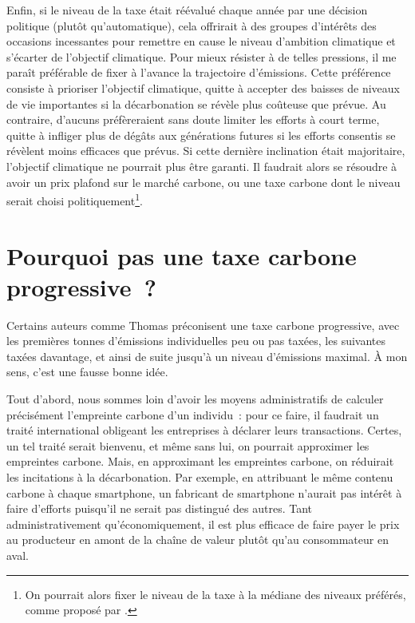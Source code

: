 \documentclass[a5paper,french,openany]{memoir}
\begin{document}
Enfin, si le niveau de la taxe était réévalué chaque année par une décision politique (plutôt qu'automatique), cela offrirait à des groupes d'intérêts des occasions incessantes pour remettre en cause le niveau d'ambition climatique et s'écarter de l'objectif climatique. Pour mieux résister à de telles pressions, il me paraît préférable de fixer à l'avance la trajectoire d'émissions. Cette préférence consiste à prioriser l'objectif climatique, quitte à accepter des baisses de niveaux de vie importantes si la décarbonation se révèle plus coûteuse que prévue. 
Au contraire, d'aucuns préfèreraient sans doute limiter les efforts à court terme, quitte à infliger plus de dégâts aux générations futures si les efforts consentis se révèlent moins efficaces que prévus. Si cette dernière inclination était majoritaire, l'objectif climatique ne pourrait plus être garanti. Il faudrait alors se résoudre à avoir un prix plafond sur le marché carbone, ou une taxe carbone dont le niveau serait choisi politiquement\footnote{On pourrait alors fixer le niveau de la taxe à la médiane des niveaux préférés, comme proposé par \cite{weitzman_world_2017}.}. 

\section*{\normalsize Pourquoi pas une taxe carbone progressive~?}\label{q:taxe_progressive}

Certains auteurs comme Thomas \cite{piketty_capital_2019} préconisent une taxe carbone progressive, avec les premières tonnes d'émissions individuelles peu ou pas taxées, les suivantes taxées davantage, et ainsi de suite jusqu'à un niveau d'émissions maximal. À mon sens, c'est une fausse bonne idée. 

Tout d'abord, nous sommes loin d'avoir les moyens administratifs de calculer précisément l'empreinte carbone d'un individu~: pour ce faire, il faudrait un traité international obligeant les entreprises à déclarer leurs transactions. Certes, un tel traité serait bienvenu, et même sans lui, on pourrait approximer les empreintes carbone. Mais, en approximant les empreintes carbone, on réduirait les incitations à la décarbonation. Par exemple, en attribuant le même contenu carbone à chaque smartphone, un fabricant de smartphone n'aurait pas intérêt à faire d'efforts puisqu'il ne serait pas distingué des autres. Tant administrativement qu'économiquement, il est plus efficace de faire payer le prix au producteur en amont de la chaîne de valeur plutôt qu'au consommateur en aval. 
\end{document}
